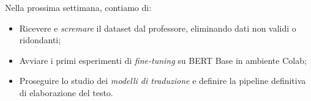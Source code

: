 \documentclass[a4paper,12pt]{article}
\begin{document}
Nella prossima settimana, contiamo di:
\begin{itemize}
    \item Ricevere e \emph{scremare} il dataset dal professore, eliminando dati non validi o ridondanti;
    \item Avviare i primi esperimenti di \emph{fine-tuning} su BERT Base in ambiente Colab;
    \item Proseguire lo studio dei \emph{modelli di traduzione} e definire la pipeline definitiva di elaborazione del testo.
\end{itemize}
\end{document}
